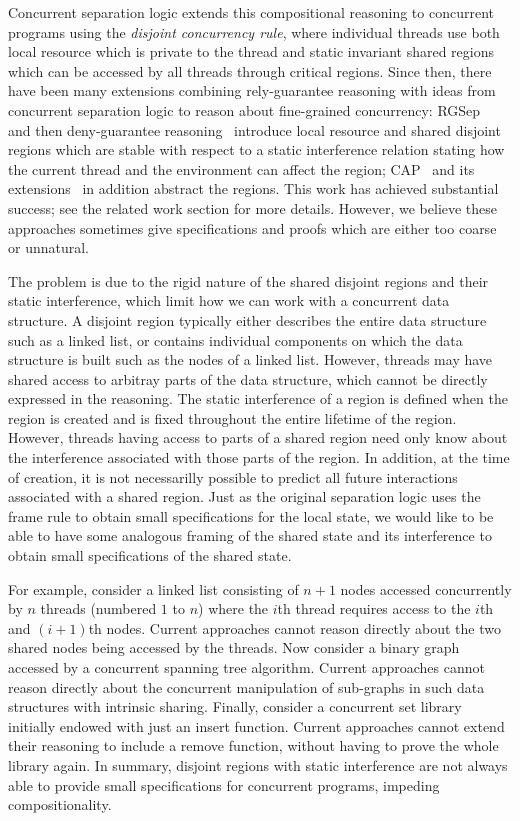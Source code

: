 Concurrent separation logic extends this compositional reasoning to
concurrent programs using the {\em disjoint concurrency rule}, where
individual threads use both local resource which is private to the
thread and static invariant shared regions which can be accessed by
all threads through critical regions. Since then, there have been many
extensions combining rely-guarantee reasoning with ideas from
concurrent separation logic to reason about fine-grained concurrency:
RGSep~\cite{viktor-marriage} and then deny-guarantee
reasoning~\cite{dg} introduce local resource and shared disjoint
regions which are stable with respect to a static interference
relation stating how the current thread and the environment can affect
the region; CAP~\cite{cap-ecoop10} and its
extensions~\cite{hocap,icap,tada} in addition abstract the
regions. This work has achieved substantial success; see the related
work section for more details. However, we believe these approaches
sometimes give specifications and proofs which are either too coarse
or unnatural.



The problem is due to the rigid nature of the shared disjoint regions and
their static interference, which   limit how we can  work
with a
concurrent data structure. A disjoint region typically either describes 
the entire data structure such as a linked list,  or contains
individual 
components on which the data structure is built such as the nodes of a
linked list. However, threads may have shared access to arbitray 
parts of the data structure, which cannot be directly expressed in the reasoning.
The   static interference   of a region 
 is defined when
the region  is created and    is fixed throughout the entire lifetime of
the region. However, 
threads having access to parts of a shared region need  only
 know about the interference associated with those parts of the
region. In addition, 
at the time  of creation, it is not necessarilly possible
to predict all future interactions  associated with  a shared
region. Just as the original separation logic  uses the frame rule to
obtain small specifications for the local state, we would like to be
able to have some analogous framing of the shared state and its
interference  to obtain small
specifications of the shared state. 


For example, consider a linked list consisting of $n+1$ nodes accessed
concurrently by $n$ threads (numbered $1$ to $n$) where the $i$th
thread requires access to the $i$th and $(i+1)$th nodes. Current
approaches cannot reason directly about the two shared nodes being
accessed by the threads. Now consider a binary graph accessed by a
concurrent spanning tree algorithm. Current approaches cannot reason
directly about the concurrent manipulation of sub-graphs in such data
structures with intrinsic sharing. Finally, consider a concurrent set
library initially endowed with just an insert function. Current
approaches cannot extend their reasoning to include a remove function,
without having to prove the whole library again. In summary, disjoint
regions with static interference are not always able to provide small
specifications for concurrent programs, impeding 
compositionality.

